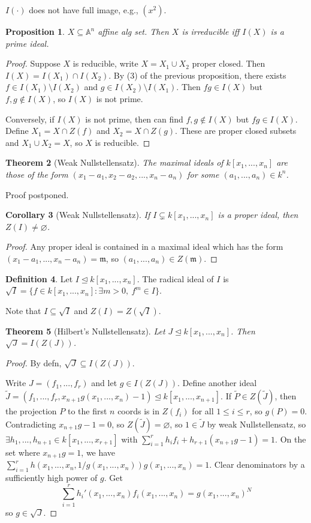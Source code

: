 \documentclass{article}
\theoremstyle{definition}
\newtheorem{defn}{Definition}[section]
\theoremstyle{remark}
\theoremstyle{plain}
\newtheorem{thm}[defn]{Theorem}
\newtheorem{prop}[defn]{Proposition}
\newtheorem{crly}[defn]{Corollary}
\newcommand{\bA}{\mathbb{A}}
\begin{document}
$I(\cdot)$ does not have full image, e.g., $(x^2)$.
\begin{prop}
    $X\subseteq\bA^n$ affine alg set. Then $X$ is irreducible iff $I(X)$ is a prime ideal.
\end{prop}
\begin{proof}
    Suppose $X$ is reducible, write $X=X_1\cup X_2$ proper closed. Then $I(X)=I(X_1)\cap I(X_2)$. By (3) of the previous proposition, there exists $f\in I(X_1)\setminus I(X_2)$ and $g\in I(X_2)\setminus I(X_1)$. Then $fg\in I(X)$ but $f,g\not\in I(X)$, so $I(X)$ is not prime.

    Conversely, if $I(X)$ is not prime, then can find $f,g\not\in I(X)$ but $fg\in I(X)$. Define $X_1=X\cap Z(f)$ and $X_2=X\cap Z(g)$. These are proper closed subsets and $X_1\cup X_2=X$, so $X$ is reducible. 
\end{proof}

\begin{thm}[Weak Nullstellensatz]
    The maximal ideals of $k[x_1,...,x_n]$ are those of the form $(x_1-a_1,x_2-a_2,...,x_n-a_n)$ for some $(a_1,...,a_n)\in k^n$.
\end{thm}
Proof postponed.
\begin{crly}[Weak Nullstellensatz]
    If $I\subsetneq k[x_1,...,x_n]$ is a proper ideal, then $Z(I)\neq\varnothing$.
\end{crly}
\begin{proof}
    Any proper ideal is contained in a maximal ideal which has the form $(x_1-a_1,...,x_n-a_n)=\mathfrak m$, so $(a_1,...,a_n)\in Z(\mathfrak m)$.
\end{proof}
\begin{defn}
    Let $I\trianglelefteq k[x_1,...,x_n]$. The radical ideal of $I$ is $\sqrt I=\{f\in k[x_1,...,x_n]:\exists m>0,\ f^m\in I\}$.
\end{defn}
Note that $I\subseteq\sqrt I$ and $Z(I)=Z(\sqrt I)$.
\begin{thm}[Hilbert's Nullstellensatz]
    Let $J\trianglelefteq k[x_1,...,x_n]$. Then $\sqrt J=I(Z(J))$.
\end{thm}
\begin{proof}
    By defn, $\sqrt J\subseteq I(Z(J))$.

    Write $J=(f_1,...,f_r)$ and let $g\in I(Z(J))$. Define another ideal $\tilde J=(f_1,...,f_r,x_{n+1}g(x_1,...,x_n)-1)\trianglelefteq k[x_1,...,x_{n+1}]$. If $\tilde P\in Z(\tilde J)$, then the projection $P$ to the first $n$ coords is in $Z(f_i)$ for all $1\le i\le r$, so $g(P)=0$. Contradicting $x_{n+1}g-1=0$, so $Z(\tilde J)=\varnothing$, so $1\in \tilde J$ by weak Nullstellensatz, so $\exists h_1,...,h_{n+1}\in k[x_1,...,x_{r+1}]$ with $\sum_{i=1}^r h_if_i+h_{r+1}(x_{n+1}g-1)=1$. On the set where $x_{n+1}g=1$, we have $\sum_{i=1}^r h(x_1,...,x_n,1/g(x_1,...,x_n))g(x_1,...,x_n)=1$. Clear denominators by a sufficiently high power of $g$. Get
    \[\sum_{i=1}^rh_i'(x_1,...,x_n)f_i(x_1,...,x_n)=g(x_1,...,x_n)^N\]
    so $g\in\sqrt J$.
\end{proof}
\end{document}
